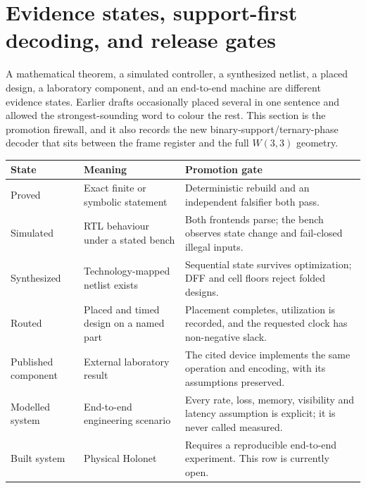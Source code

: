 \section{Evidence states, support-first decoding, and release gates}\label{sec:evidence}

\begin{plain}
A mathematical theorem, a simulated controller, a synthesized netlist, a placed design, a
laboratory component, and an end-to-end machine are different evidence states. Earlier
drafts occasionally placed several in one sentence and allowed the strongest-sounding
word to colour the rest. This section is the promotion firewall, and it also records the
new binary-support/ternary-phase decoder that sits between the frame register and the
full $W(3,3)$ geometry.
\end{plain}

\begin{spec}
\begin{center}
\begin{tabular}{@{}p{2.0cm}p{4.4cm}p{6.2cm}@{}}
\toprule
\textbf{State} & \textbf{Meaning} & \textbf{Promotion gate}\\
\midrule
Proved & Exact finite or symbolic statement & Deterministic rebuild and an independent
falsifier both pass.\\
Simulated & RTL behaviour under a stated bench & Both frontends parse; the bench observes
state change and fail-closed illegal inputs.\\
Synthesized & Technology-mapped netlist exists & Sequential state survives optimization;
DFF and cell floors reject folded designs.\\
Routed & Placed and timed design on a named part & Placement completes, utilization is
recorded, and the requested clock has non-negative slack.\\
Published component & External laboratory result & The cited device implements the same
operation and encoding, with its assumptions preserved.\\
Modelled system & End-to-end engineering scenario & Every rate, loss, memory, visibility
and latency assumption is explicit; it is never called measured.\\
Built system & Physical Holonet & Requires a reproducible end-to-end experiment. This row
is currently open.\\
\bottomrule
\end{tabular}
\end{center}
\end{spec}

